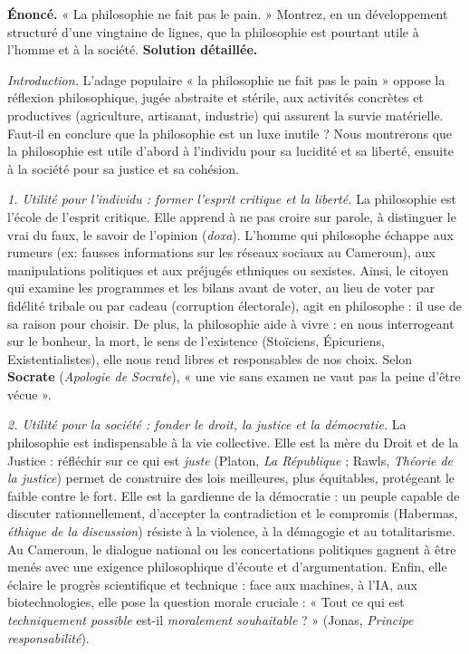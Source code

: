 \documentclass[11pt]{article}
\newcommand{\cle}[1]{{\popxbold\color{popdark}#1}}
\begin{document}
\begin{exoresolu}
\textbf{Énoncé.} « La philosophie ne fait pas le pain. » Montrez, en un développement structuré d'une vingtaine de lignes, que la philosophie est pourtant utile à l'homme et à la société.
\tcblower
\textbf{Solution détaillée.}

\emph{Introduction.} L'adage populaire « la philosophie ne fait pas le pain » oppose la réflexion philosophique, jugée abstraite et stérile, aux activités concrètes et productives (agriculture, artisanat, industrie) qui assurent la survie matérielle. Faut-il en conclure que la philosophie est un luxe inutile ? Nous montrerons que la philosophie est utile d'abord à l'individu pour sa lucidité et sa liberté, ensuite à la société pour sa justice et sa cohésion.

\emph{1. Utilité pour l'individu : former l'esprit critique et la liberté.}
La philosophie est l'école de l'\cle{esprit critique}. Elle apprend à ne pas croire sur parole, à distinguer le \cle{vrai} du \cle{faux}, le \cle{savoir} de l'\cle{opinion} (\emph{doxa}). L'homme qui philosophe échappe aux rumeurs (ex: fausses informations sur les réseaux sociaux au Cameroun), aux manipulations politiques et aux préjugés ethniques ou sexistes. Ainsi, le citoyen qui examine les programmes et les bilans avant de voter, au lieu de voter par fidélité tribale ou par cadeau (corruption électorale), agit en philosophe : il use de sa \cle{raison} pour choisir. De plus, la philosophie aide à \cle{vivre} : en nous interrogeant sur le bonheur, la mort, le sens de l'existence (Stoïciens, Épicuriens, Existentialistes), elle nous rend \cle{libres} et \cle{responsables} de nos choix. Selon \textbf{Socrate} (\emph{Apologie de Socrate}), « une vie sans examen ne vaut pas la peine d'être vécue ».

\emph{2. Utilité pour la société : fonder le droit, la justice et la démocratie.}
La philosophie est indispensable à la vie collective. Elle est la mère du \cle{Droit} et de la \cle{Justice} : réfléchir sur ce qui est \emph{juste} (Platon, \emph{La République} ; Rawls, \emph{Théorie de la justice}) permet de construire des lois meilleures, plus équitables, protégeant le faible contre le fort. Elle est la gardienne de la \cle{démocratie} : un peuple capable de discuter rationnellement, d'accepter la contradiction et le compromis (Habermas, \emph{éthique de la discussion}) résiste à la violence, à la démagogie et au totalitarisme. Au Cameroun, le dialogue national ou les concertations politiques gagnent à être menés avec une exigence philosophique d'écoute et d'argumentation. Enfin, elle éclaire le \cle{progrès scientifique et technique} : face aux machines, à l'IA, aux biotechnologies, elle pose la question morale cruciale : « Tout ce qui est \emph{techniquement possible} est-il \emph{moralement souhaitable} ? » (Jonas, \emph{Principe responsabilité}).


\end{exoresolu}
\end{document}
